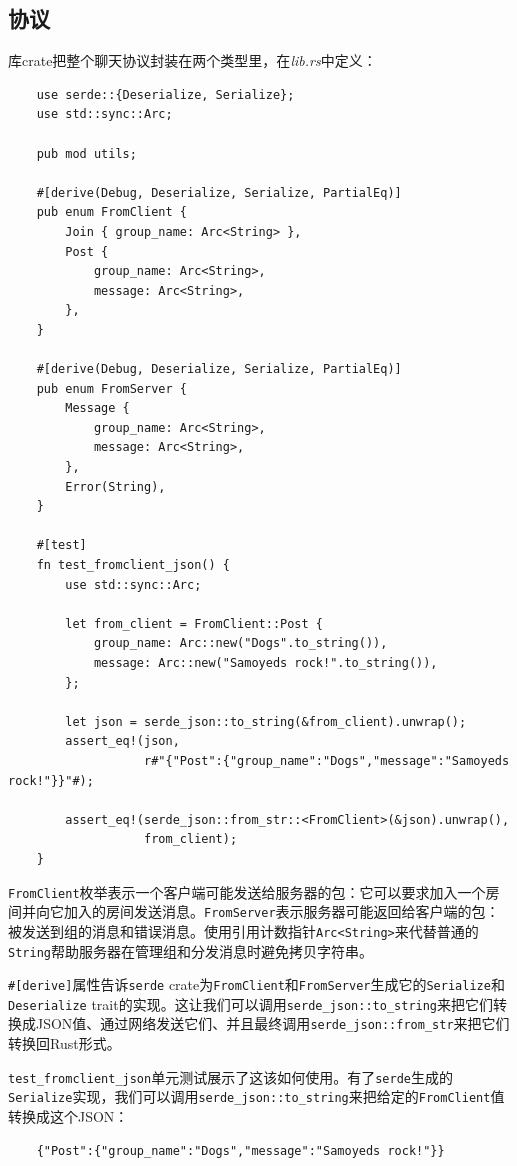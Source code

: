\subsection{协议}
库crate把整个聊天协议封装在两个类型里，在\emph{lib.rs}中定义：
\begin{verbatim}
    use serde::{Deserialize, Serialize};
    use std::sync::Arc;

    pub mod utils;

    #[derive(Debug, Deserialize, Serialize, PartialEq)]
    pub enum FromClient {
        Join { group_name: Arc<String> },
        Post {
            group_name: Arc<String>,
            message: Arc<String>,
        },
    }

    #[derive(Debug, Deserialize, Serialize, PartialEq)]
    pub enum FromServer {
        Message {
            group_name: Arc<String>,
            message: Arc<String>,
        },
        Error(String),
    }

    #[test]
    fn test_fromclient_json() {
        use std::sync::Arc;

        let from_client = FromClient::Post {
            group_name: Arc::new("Dogs".to_string()),
            message: Arc::new("Samoyeds rock!".to_string()),
        };

        let json = serde_json::to_string(&from_client).unwrap();
        assert_eq!(json,
                   r#"{"Post":{"group_name":"Dogs","message":"Samoyeds rock!"}}"#);
        
        assert_eq!(serde_json::from_str::<FromClient>(&json).unwrap(),
                   from_client);
    }
\end{verbatim}

\texttt{FromClient}枚举表示一个客户端可能发送给服务器的包：它可以要求加入一个房间并向它加入的房间发送消息。\texttt{FromServer}表示服务器可能返回给客户端的包：被发送到组的消息和错误消息。使用引用计数指针\texttt{Arc<String>}来代替普通的\texttt{String}帮助服务器在管理组和分发消息时避免拷贝字符串。

\texttt{\#[derive]}属性告诉\texttt{serde} crate为\texttt{FromClient}和\texttt{FromServer}生成它的\texttt{Serialize}和\texttt{Deserialize} trait的实现。这让我们可以调用\texttt{serde\_json::to\_string}来把它们转换成JSON值、通过网络发送它们、并且最终调用\texttt{serde\_json::from\_str}来把它们转换回Rust形式。

\texttt{test\_fromclient\_json}单元测试展示了这该如何使用。有了\texttt{serde}生成的\texttt{Serialize}实现，我们可以调用\texttt{serde\_json::to\_string}来把给定的\texttt{FromClient}值转换成这个JSON：
\begin{verbatim}
    {"Post":{"group_name":"Dogs","message":"Samoyeds rock!"}}
\end{verbatim}

